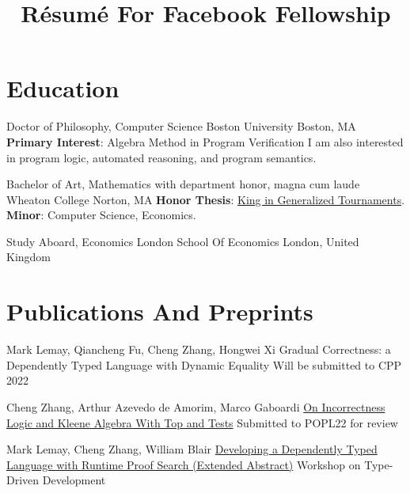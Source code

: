 \documentclass[11pt,roman]{moderncv}        %
\title{Résumé For Facebook Fellowship}
\begin{document}

\makecvtitle{}

\setlength{\parskip}{2.5px}
\linespread{1.3}
\selectfont


\section{Education}

{Doctor of Philosophy, Computer Science} {}
{Boston University}
{Boston, MA}
{\textbf{Primary Interest}: Algebra Method in Program Verification\newline 
I am also interested in program logic, automated reasoning, and program semantics.}  %

{Bachelor of Art, Mathematics} {with department honor, magna cum laude}
{Wheaton College}
{Norton, MA}
{\textbf{Honor Thesis}: \href{http://hdl.handle.net/11040/24570}{King in Generalized Tournaments}.\\
\textbf{Minor}: Computer Science, Economics.
}

{Study Aboard, Economics} {}
{London School Of Economics}
{London, United Kingdom}
{}  %



\section{Publications And Preprints}

{Mark Lemay, Qiancheng Fu, Cheng Zhang, Hongwei Xi}
{Gradual Correctness: a Dependently Typed Language with Dynamic Equality}
{Will be submitted to CPP 2022}{}{}

{Cheng Zhang, Arthur Azevedo de Amorim, Marco Gaboardi}
{\href{https://arxiv.org/abs/2108.07707}{On Incorrectness Logic and Kleene Algebra With Top and Tests}}
{Submitted to POPL22 for review}
{}{}

{Mark Lemay, Cheng Zhang, William Blair}
{\href{https://icfp20.sigplan.org/details/tyde-2020-papers/7/Developing-a-Dependently-Typed-Language-with-Runtime-Proof-Search-Extended-Abstract-}
{Developing a Dependently Typed Language with Runtime Proof Search (Extended Abstract)}}
{Workshop on Type-Driven Development}
{}{}
\end{document}
